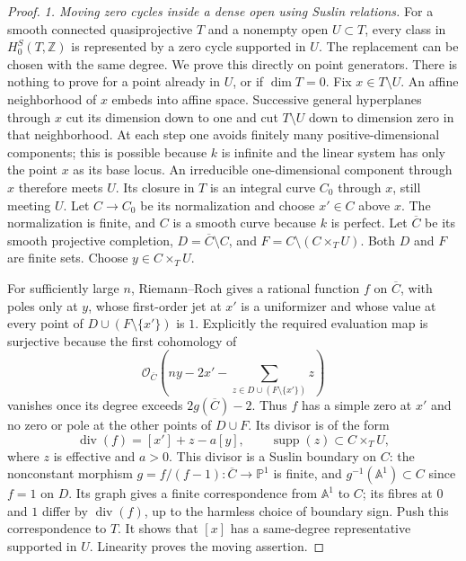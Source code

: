 \begin{proof}
\emph{1. Moving zero cycles inside a dense open using Suslin relations.}
For a smooth connected quasiprojective $T$ and a nonempty
open $U\subset T$, every class in $H^S_0(T,\mathbb Z)$
is represented by a zero cycle supported in $U$.
The replacement can be chosen with the same degree.
We prove this directly on point generators.
There is nothing to prove for a point already in $U$,
or if $\dim T=0$.
Fix $x\in T\setminus U$.  An affine neighborhood of $x$
embeds into affine space.  Successive general hyperplanes
through $x$ cut its dimension down to one and cut
$T\setminus U$ down to dimension zero in that neighborhood.
At each step one avoids finitely many positive-dimensional
components; this is possible because $k$ is infinite and
the linear system has only the point $x$ as its base locus.
An irreducible one-dimensional component through $x$
therefore meets $U$.  Its closure in $T$ is an integral
curve $C_0$ through $x$, still meeting $U$.
Let $C\to C_0$ be its normalization and choose
$x'\in C$ above $x$.  The normalization is finite,
and $C$ is a smooth curve because $k$ is perfect.
Let $\overline C$ be its smooth projective completion,
$D=\overline C\setminus C$, and
$F=C\setminus(C\times_T U)$.
Both $D$ and $F$ are finite sets.  Choose
$y\in C\times_T U$.

For sufficiently large $n$, Riemann--Roch gives a rational
function $f$ on $\overline C$, with poles only at $y$,
whose first-order jet at $x'$ is a uniformizer and whose
value at every point of $D\cup(F\setminus\{x'\})$
is $1$.  Explicitly the required evaluation map is
surjective because the first cohomology of
\[
 \mathcal O_{\overline C}
 \left(ny-2x'-\sum_{z\in D\cup(F\setminus\{x'\})}z\right)
\]
vanishes once its degree exceeds $2g(\overline C)-2$.
Thus $f$ has a simple zero at $x'$ and no zero or pole
at the other points of $D\cup F$.
Its divisor is of the form
\[
 \operatorname{div}(f)=[x']+z-a[y],
 \qquad \operatorname{supp}(z)\subset C\times_T U,
\]
where $z$ is effective and $a>0$.
This divisor is a Suslin boundary on $C$:
the nonconstant morphism
$g=f/(f-1):\overline C\to\mathbb P^1$ is finite,
and $g^{-1}(\mathbb A^1)\subset C$ since $f=1$ on $D$.
Its graph gives a finite correspondence from
$\mathbb A^1$ to $C$; its fibres at $0$ and $1$
differ by $\operatorname{div}(f)$, up to the harmless
choice of boundary sign.  Push this correspondence to
$T$.  It shows that $[x]$ has a same-degree representative
supported in $U$.  Linearity proves the moving assertion.


\end{proof}
